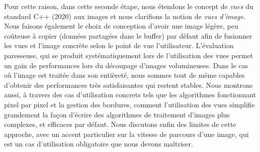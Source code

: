 Pour cette raison, dans cette seconde étape, nous étendons le concept de \emph{vues} du standard C++ (2020) aux images
et nous clarifions la notion de \emph{vues d'image}. Nous faisons également le choix de conception d'avoir une image
légère, peu coûteuse à copier (données partagées dans le buffer) par défaut afin de fusionner les vues et l'image
concrète selon le point de vue l'utilisateur. L'évaluation paresseuse, qui se produit systématiquement lors de
l'utilisation des vues permet un gain de performances lors du découpage d'images volumineuses. Dans le cas où l'image
est traitée dans son entièreté, nous sommes tout de même capables d'obtenir des performances très satisfaisantes qui
restent stables. Nous montrons aussi, à travers des cas d'utilisation concrets tels que les algorithmes fonctionnant
pixel par pixel et la gestion des bordures, comment l'utilisation des vues simplifie grandement la façon d'écrire des
algorithmes de traitement d'images plus complexes, et efficaces par défaut. Nous discutons enfin des limites de cette
approche, avec un accent particulier sur la vitesse de parcours d'une image, qui est un cas d'utilisation obligatoire
que nous devons maîtriser.

